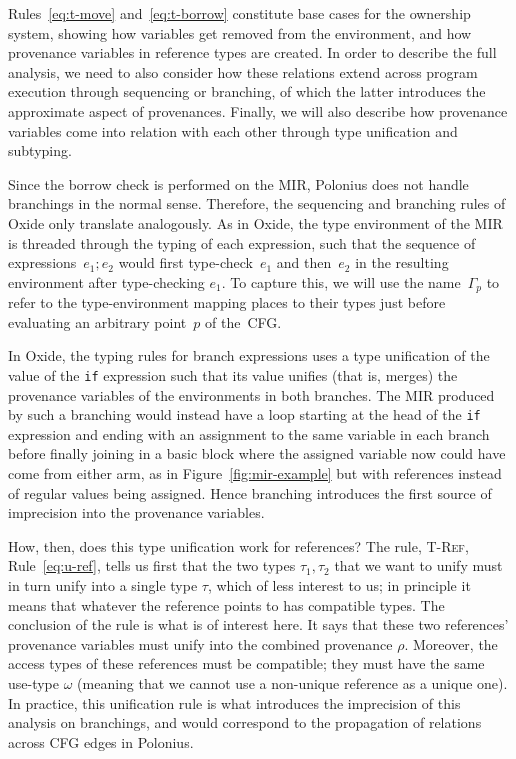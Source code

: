 \documentclass[11pt,a4paper,twoside,openany]{report}
\newcommand{\InRust}[1]{\texttt{#1}}
\newcommand{\expression}[1]{\boxed{#1}}
\begin{document}
Rules~\eqref{eq:t-move} and~\eqref{eq:t-borrow} constitute base cases for the
ownership system, showing how variables get removed from the environment, and
how provenance variables in reference types are created. In order to describe
the full analysis, we need to also consider how these relations extend across
program execution through sequencing or branching, of which the latter
introduces the approximate aspect of provenances. Finally, we will also describe
how provenance variables come into relation with each other through type
unification and subtyping.

Since the borrow check is performed on the MIR, Polonius does not handle
branchings in the normal sense. Therefore, the sequencing and branching rules of
Oxide only translate analogously. As in Oxide, the type environment of the MIR
is threaded through the typing of each expression, such that the sequence of
expressions~$\expression{e_1; e_2}$ would first type-check~$e_1$ and then~$e_2$
in the resulting environment after type-checking $e_1$. To capture this, we will
use the name~$\Gamma_p$ to refer to the type-environment mapping places to their
types just before evaluating an arbitrary point~$p$ of the~CFG.

In Oxide, the typing rules for branch expressions uses a type unification of the
value of the \InRust{if} expression such that its value unifies (that is,
merges) the provenance variables of the environments in both branches. The MIR
produced by such a branching would instead have a loop starting at the head of
the \InRust{if} expression and ending with an assignment to the same variable in
each branch before finally joining in a basic block where the assigned variable
now could have come from either arm, as in Figure~\ref{fig:mir-example} but with
references instead of regular values being assigned. Hence branching introduces
the first source of imprecision into the provenance variables.

How, then, does this type unification work for references? The rule,
\textsc{T-Ref}, Rule~\eqref{eq:u-ref}, tells us first that the two types
$\tau_1, \tau_2$ that we want to unify must in turn unify into a single type
$\tau$, which of less interest to us; in principle it means that whatever the
reference points to has compatible types. The conclusion of the rule is what is
of interest here. It says that these two references' provenance variables must
unify into the combined provenance $\rho$. Moreover, the access types of these
references must be compatible; they must have the same use-type $\omega$
(meaning that we cannot use a non-unique reference as a unique one). In
practice, this unification rule is what introduces the imprecision of this
analysis on branchings, and would correspond to the propagation of relations
across CFG edges in Polonius.
\end{document}

